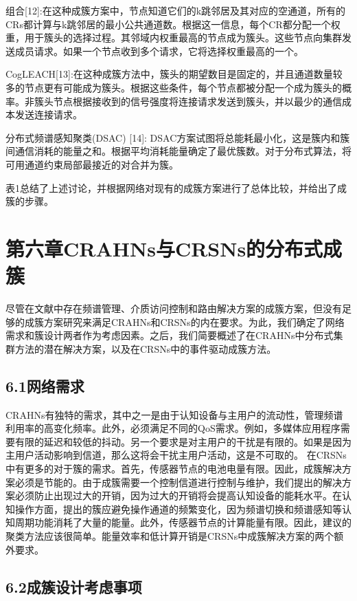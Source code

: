 \documentclass[a4paper,AutoFakeBold,oneside,12pt]{book}
\begin{document}
  组合[12]:在这种成簇方案中，节点知道它们的k跳邻居及其对应的空通道，所有的CRs都计算与k跳邻居的最小公共通道数。根据这一信息，每个CR都分配一个权重，用于簇头的选择过程。其邻域内权重最高的节点成为簇头。这些节点向集群发送成员请求。如果一个节点收到多个请求，它将选择权重最高的一个。

  CogLEACH[13]:在这种成簇方法中，簇头的期望数目是固定的，并且通道数量较多的节点更有可能成为簇头。根据这些条件，每个节点都被分配一个成为簇头的概率。非簇头节点根据接收到的信号强度将连接请求发送到簇头，并以最少的通信成本发送连接请求。

  分布式频谱感知聚类(DSAC) [14]: DSAC方案试图将总能耗最小化，这是簇内和簇间通信消耗的能量之和。根据平均消耗能量确定了最优簇数。对于分布式算法，将可用通道约束局部最接近的对合并为簇。

  表1总结了上述讨论，并根据网络对现有的成簇方案进行了总体比较，并给出了成簇的步骤。

\chapter*{第六章\quad{}CRAHNs与CRSNs的分布式成簇}

  尽管在文献中存在频谱管理、介质访问控制和路由解决方案的成簇方案，但没有足够的成簇方案研究来满足CRAHNs和CRSNs的内在要求。为此，我们确定了网络需求和簇设计两者作为考虑因素。之后，我们简要概述了在CRAHNs中分布式集群方法的潜在解决方案，以及在CRSNs中的事件驱动成簇方法。

\section*{6.1\quad{}网络需求}

  CRAHNs有独特的需求，其中之一是由于认知设备与主用户的流动性，管理频谱利用率的高变化频率。此外，必须满足不同的QoS需求。例如，多媒体应用程序需要有限的延迟和较低的抖动。另一个要求是对主用户的干扰是有限的。如果是因为主用户活动影响到信道，那么这将会干扰主用户活动，这是不可取的。
  在CRSNs中有更多的对于簇的需求。首先，传感器节点的电池电量有限。因此，成簇解决方案必须是节能的。由于成簇需要一个控制信道进行控制与维护，我们提出的解决方案必须防止出现过大的开销，因为过大的开销将会提高认知设备的能耗水平。在认知操作方面，提出的簇应避免操作通道的频繁变化，因为频谱切换和频谱感知等认知周期功能消耗了大量的能量。此外，传感器节点的计算能量有限。因此，建议的聚类方法应该很简单。能量效率和低计算开销是CRSNs中成簇解决方案的两个额外要求。

\section*{6.2\quad{}成簇设计考虑事项}
\end{document}
